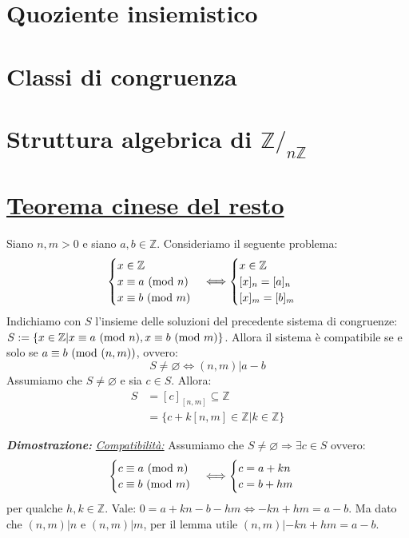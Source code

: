 \documentclass[oneside]{book}
\begin{document}
\section{Quoziente insiemistico}
\section{Classi di congruenza}
\section{Struttura algebrica di $\mathbb{Z}/_{n\mathbb{Z}}$}

\section{\underline{Teorema cinese del resto}}
\begin{tcolorbox}[enhanced, breakable, title={Teolema cinese del lesto}]
Siano $n,m>0$ e siano $a,b \in \mathbb{Z}$. Consideriamo il seguente problema:
\[
    \begin{cases}
        x \in \mathbb{Z}\\
        x \equiv a \ (\mathrm{mod}\ n)\\
        x \equiv b \ (\mathrm{mod}\ m)
    \end{cases}
    \Longleftrightarrow
    \begin{cases}
        x \in \mathbb{Z}\\
        [x]_n = [a]_n\\
        [x]_m = [b]_m
    \end{cases}
\]
Indichiamo con $S$ l'insieme delle soluzioni del precedente sistema di congruenze:
$S:=\{ x \in \mathbb{Z}| x \equiv a \ (\mathrm{mod}\ n), x \equiv b \ (\mathrm{mod}\ m) \}$.
Allora il sistema è compatibile se e solo se $a \equiv b \ (\mathrm{mod}\ (n,m))$, ovvero:
\[ S\not = \varnothing \Longleftrightarrow (n,m)|a-b \]
Assumiamo che $S \not = \varnothing$ e sia $c\in S$. Allora:
\begin{align*}
    S &=[c]_{[n,m]} \subseteq \mathbb{Z}\\
    &=\{ c+k[n,m] \in \mathbb{Z}| k \in \mathbb{Z} \}
\end{align*}

\emph{\textbf{Dimostrazione:}} \underline{\emph{Compatibilità:}} Assumiamo che
$S \not = \varnothing \Rightarrow \exists c \in S$ ovvero:
\[
    \begin{cases}
        c \equiv a \ (\mathrm{mod}\ n)\\
        c \equiv b \ (\mathrm{mod}\ m)
    \end{cases}
    \Longleftrightarrow
    \begin{cases}
        c = a+kn\\
        c = b+hm
    \end{cases}
\]
per qualche $h,k \in \mathbb{Z}$. Vale: $ 0 = a+kn - b-hm \Leftrightarrow -kn+hm = a-b $.
Ma dato che $(n,m)|n$ e $(n,m)|m$, per il lemma utile $(n,m)|-kn+hm = a-b$.


\end{tcolorbox}
\end{document}
